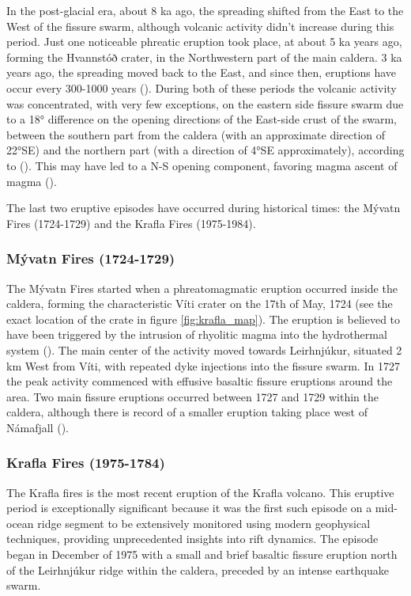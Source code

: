 In the post-glacial era, about 8 ka ago, the spreading shifted from the East to the West of the fissure swarm, although volcanic activity didn't increase during this period. Just one noticeable phreatic eruption took place, at about 5 ka years ago, forming the Hvannstóð crater, in the Northwestern part of the main caldera. 3 ka years ago, the spreading moved back to the East, and since then, eruptions have occur every 300-1000 years (\cite{sæmundsson1991}). During both of these periods the volcanic activity was concentrated, with very few exceptions, on the eastern side fissure swarm due to a 18° difference on the opening directions of the East-side crust of the swarm, between the southern part from the caldera (with an approximate direction of 22°SE) and the northern part (with a direction of 4°SE approximately), according to (\cite{drouin2017}). This may have led to a N-S opening component, favoring magma ascent of magma (\cite{arnason2020}).

The last two eruptive episodes have occurred during historical times: the Mývatn Fires (1724-1729) and the Krafla Fires (1975-1984).

\subsubsection{Mývatn Fires (1724-1729)}
The Mývatn Fires started when a phreatomagmatic eruption occurred inside the caldera, forming the characteristic Víti crater on the 17th of May, 1724 (see the exact location of the crate in figure \ref{fig:krafla_map}). The eruption is believed to have been triggered by the intrusion of rhyolitic magma into the hydrothermal system (\cite{montanaro2021}). The main center of the activity moved towards Leirhnjúkur, situated 2 km West from Víti, with repeated dyke injections into the fissure swarm. In 1727 the peak activity commenced with effusive basaltic fissure eruptions around the area. Two main fissure eruptions occurred between 1727 and 1729 within the caldera, although there is record of a smaller eruption taking place west of Námafjall (\cite{sæmundsson1991}).

\subsubsection{Krafla Fires (1975-1784)}
The Krafla fires is the most recent eruption of the Krafla volcano. This eruptive period is exceptionally significant because it was the first such episode on a mid-ocean ridge segment to be extensively monitored using modern geophysical techniques, providing unprecedented insights into rift dynamics. The episode began in December of 1975 with a small and brief basaltic fissure eruption north of the Leirhnjúkur ridge within the caldera, preceded by an intense earthquake swarm.

